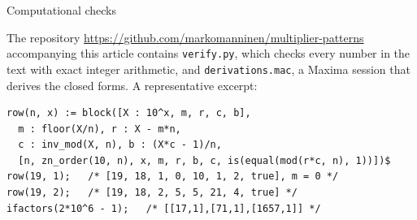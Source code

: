 \documentclass[11pt,a4paper]{amsart}
\makeatletter
\def\section{\@startsection{section}{1}%
  \z@{-.7\linespacing\@plus-\linespacing}{.5\linespacing}%
  {\normalfont\scshape\centering}}
\theoremstyle{definition}
\theoremstyle{remark}
\makeatother
\begin{document}
\appendix
\section{Computational checks}\label{app:code}

The repository \url{https://github.com/markomanninen/multiplier-patterns} accompanying this article contains \texttt{verify.py}, which checks
every number in the text with exact integer arithmetic, and
\texttt{derivations.mac}, a Maxima session that derives the closed forms. A
representative excerpt:

\begin{lstlisting}
row(n, x) := block([X : 10^x, m, r, c, b],
  m : floor(X/n), r : X - m*n,
  c : inv_mod(X, n), b : (X*c - 1)/n,
  [n, zn_order(10, n), x, m, r, b, c, is(equal(mod(r*c, n), 1))])$
row(19, 1);   /* [19, 18, 1, 0, 10, 1, 2, true], m = 0 */
row(19, 2);   /* [19, 18, 2, 5, 5, 21, 4, true] */
ifactors(2*10^6 - 1);   /* [[17,1],[71,1],[1657,1]] */
\end{lstlisting}



\end{document}
